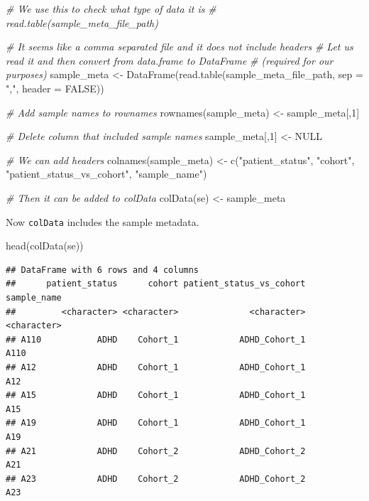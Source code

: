 \documentclass[
]{book}
\newenvironment{Shaded}{\begin{snugshade}}{\end{snugshade}}
\newcommand{\AttributeTok}[1]{\textcolor[rgb]{0.77,0.63,0.00}{#1}}
\newcommand{\CommentTok}[1]{\textcolor[rgb]{0.56,0.35,0.01}{\textit{#1}}}
\newcommand{\ConstantTok}[1]{\textcolor[rgb]{0.00,0.00,0.00}{#1}}
\newcommand{\DecValTok}[1]{\textcolor[rgb]{0.00,0.00,0.81}{#1}}
\newcommand{\FunctionTok}[1]{\textcolor[rgb]{0.00,0.00,0.00}{#1}}
\newcommand{\NormalTok}[1]{#1}
\newcommand{\OtherTok}[1]{\textcolor[rgb]{0.56,0.35,0.01}{#1}}
\newcommand{\StringTok}[1]{\textcolor[rgb]{0.31,0.60,0.02}{#1}}
\begin{document}
\begin{Shaded}
\begin{Highlighting}[]
\CommentTok{\# We use this to check what type of data it is}
\CommentTok{\# read.table(sample\_meta\_file\_path)}

\CommentTok{\# It seems like a comma separated file and it does not include headers}
\CommentTok{\# Let us read it and then convert from data.frame to DataFrame}
\CommentTok{\# (required for our purposes)}
\NormalTok{sample\_meta }\OtherTok{\textless{}{-}} \FunctionTok{DataFrame}\NormalTok{(}\FunctionTok{read.table}\NormalTok{(sample\_meta\_file\_path, }\AttributeTok{sep =} \StringTok{","}\NormalTok{, }\AttributeTok{header =} \ConstantTok{FALSE}\NormalTok{))}

\CommentTok{\# Add sample names to rownames}
\FunctionTok{rownames}\NormalTok{(sample\_meta) }\OtherTok{\textless{}{-}}\NormalTok{ sample\_meta[,}\DecValTok{1}\NormalTok{]}

\CommentTok{\# Delete column that included sample names}
\NormalTok{sample\_meta[,}\DecValTok{1}\NormalTok{] }\OtherTok{\textless{}{-}} \ConstantTok{NULL}

\CommentTok{\# We can add headers}
\FunctionTok{colnames}\NormalTok{(sample\_meta) }\OtherTok{\textless{}{-}} \FunctionTok{c}\NormalTok{(}\StringTok{"patient\_status"}\NormalTok{, }\StringTok{"cohort"}\NormalTok{, }\StringTok{"patient\_status\_vs\_cohort"}\NormalTok{, }\StringTok{"sample\_name"}\NormalTok{)}

\CommentTok{\# Then it can be added to colData}
\FunctionTok{colData}\NormalTok{(se) }\OtherTok{\textless{}{-}}\NormalTok{ sample\_meta}
\end{Highlighting}
\end{Shaded}

Now \texttt{colData} includes the sample metadata.

\begin{Shaded}
\begin{Highlighting}[]
\FunctionTok{head}\NormalTok{(}\FunctionTok{colData}\NormalTok{(se))}
\end{Highlighting}
\end{Shaded}

\begin{verbatim}
## DataFrame with 6 rows and 4 columns
##      patient_status      cohort patient_status_vs_cohort sample_name
##         <character> <character>              <character> <character>
## A110           ADHD    Cohort_1            ADHD_Cohort_1        A110
## A12            ADHD    Cohort_1            ADHD_Cohort_1         A12
## A15            ADHD    Cohort_1            ADHD_Cohort_1         A15
## A19            ADHD    Cohort_1            ADHD_Cohort_1         A19
## A21            ADHD    Cohort_2            ADHD_Cohort_2         A21
## A23            ADHD    Cohort_2            ADHD_Cohort_2         A23
\end{verbatim}
\end{document}
